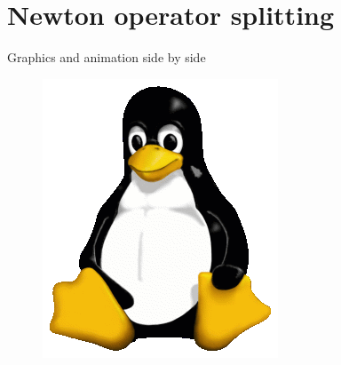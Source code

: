 \documentclass[11pt,t]{beamer}
\begin{document}
\section{Newton operator splitting}
\begin{frame}{Graphics and animation side by side}
	\begin{figure}
		\begin{minipage}[b]{0.49\linewidth}
			\centering
			\includegraphics[width=.3\textwidth]{Tux}
		\end{minipage}
		\hfill	
		\begin{minipage}[b]{0.5\linewidth}
			\centering
		\end{minipage}
	\end{figure}
\end{frame}
\end{document}
